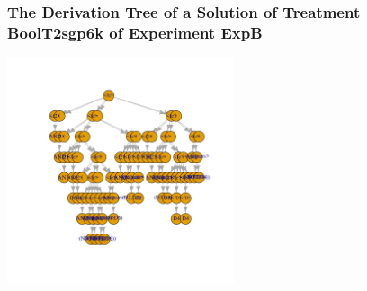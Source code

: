  \begin{frame}
 \frametitle{ The Derivation Tree of a Solution of Treatment BoolT2sgp6k of Experiment ExpB }
 \begin{center}
\includegraphics[width=0.5\textwidth, angle=0]
{ExpBDerivationTreeFigure014.pdf}
 \end{center}
 \label{report/ExpBDerivationTreeFigure014.pdf}  
 \end{frame}

